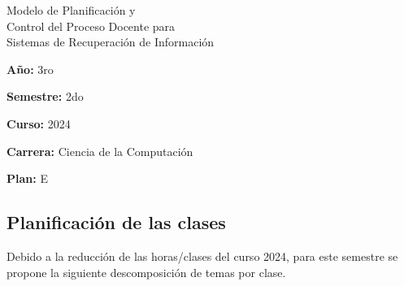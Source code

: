 \documentclass[11pt]{article}
\date{\displaydate{date}}
\begin{document}
	
	
	\begin{centering}
		\huge Modelo de Planificación y\\Control del Proceso Docente para\\Sistemas de Recuperación de Información
		
	\end{centering}
	
	\vspace{2\baselineskip}
	
	\textbf{Año:} 3ro 
	
	\textbf{Semestre:} 2do 
	
	\textbf{Curso:} 2024 
	
	\textbf{Carrera:} Ciencia de la Computación 
		
	\textbf{Plan:} E 
	
	
	\subsection*{Planificación de las clases}
	
	Debido a la reducción de las horas/clases del curso 2024, para este semestre se propone la siguiente descomposición de temas por clase. 
	
\end{document}
